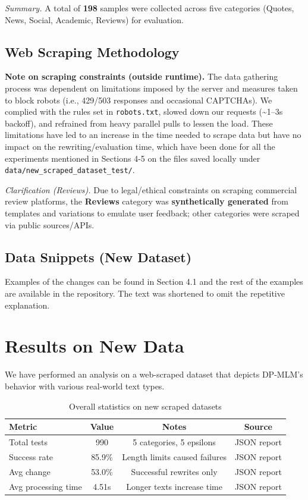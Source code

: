 \documentclass[11pt]{article}
\begin{document}
\noindent\textit{Summary.} A total of \textbf{198} samples were collected across five categories (Quotes, News, Social, Academic, Reviews) for evaluation.

\subsection{Web Scraping Methodology}

\noindent\textbf{Note on scraping constraints (outside runtime).} The data gathering process was dependent on limitations imposed by the server and measures taken to block robots (i.e., 429/503 responses and occasional CAPTCHAs). We complied with the rules set in \texttt{robots.txt}, slowed down our requests (\textasciitilde{}1--3s backoff), and refrained from heavy parallel pulls to lessen the load. These limitations have led to an increase in the time needed to scrape data but have no impact on the rewriting/evaluation time, which have been done for all the experiments mentioned in Sections 4-5 on the files saved locally under \texttt{data/new\_scraped\_dataset\_test/}.

\textit{Clarification (Reviews).} Due to legal/ethical constraints on scraping commercial review platforms, the \textbf{Reviews} category was \textbf{synthetically generated} from templates and variations to emulate user feedback; other categories were scraped via public sources/APIs.

\subsection{Data Snippets (New Dataset)}
\noindent Examples of the changes can be found in Section 4.1 and the rest of the examples are available in the repository. The text was shortened to omit the repetitive explanation.


\section{Results on New Data}
We have performed an analysis on a web-scraped dataset that depicts DP-MLM's behavior with various real-world text types.

\begin{table}[H]
  \centering
  \caption{Overall statistics on new scraped datasets}
  \begin{tabular}{lccc}
    \toprule
    Metric & Value & Notes & Source \\
    \midrule
    Total tests & 990 & 5 categories, 5 epsilons & JSON report \\
    Success rate & 85.9\% & Length limits caused failures & JSON report \\
    Avg change & 53.0\% & Successful rewrites only & JSON report \\
    Avg processing time & 4.51s & Longer texts increase time & JSON report \\
    \bottomrule
  \end{tabular}
\end{table}
\end{document}
